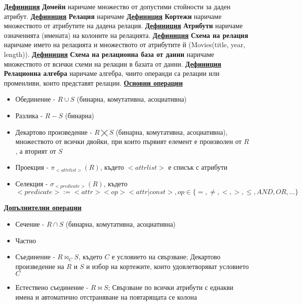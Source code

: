 \documentclass{article}
\begin{document}
\textbf{\underline{Дефиниция}}
\textbf{Домейн} наричаме множество от допустими стойности за даден атрибут. \newline\newline
\textbf{\underline{Дефиниция}}
\textbf{Релация} наричаме \newline\newline
\textbf{\underline{Дефиниция}}
\textbf{Кортежи} наричаме множеството от атрибутите на дадена релация. \newline\newline
\textbf{\underline{Дефиниция}}
\textbf{Атрибути} наричаме означенията (имената) на колоните на релацията. \newline\newline
\textbf{\underline{Дефиниция}}
\textbf{Схема на релация} наричаме името на релацията и множеството от атрибутите й (Movies(title, year, length)). \newline\newline
\textbf{\underline{Дефиниция}}
\textbf{Схема на релационна база от данни} наричаме множеството от всички схеми на релации в базата от данни. \newline\newline
\textbf{\underline{Дефиниция}}
\textbf{Релационна алгебра} наричаме алгебра, чиито операнди са релации или променливи, които представят релации. \newline\newline
\textbf{\underline{Основни операции}}
\begin{itemize}
    \item Обединение - $R \cup S$ (бинарна, комутативна, асоциативна)
    \item Разлика - $R - S$ (бинарна)
    \item Декартово произведение - $R \bigtimes S$ (бинарна, комутативна, асоциативна), множеството от всички двойки, при
    които първият елемент е произволен от $R$, а вторият от $S$
    \item Проекция - $\pi_{<attr list>}(R)$, където $<attrlist>$ е списък с атрибути
    \item Селекция - $\sigma_{<predicate>}(R)$, където $<predicate> := <attr><op><attr|const>, op \in \{=, \neq, <, >, \le, AND, OR, ...\}$
\end{itemize}
\textbf{\underline{Допълнителни операции}}
\begin{itemize}
    \item Сечение - $R \cap S$ (бинарна, комутативна, асоциативна)
    \item Частно
    \item Съединение - $R \bowtie_C S$, където $C$ е условието на свързване; Декартово произведение на $R$ и $S$
    и избор на кортежите, които удовлетворяват условието $C$
    \item Естествено съединение - $R \bowtie S$; Свързване по всички атрибути с еднакви имена и автоматично
    отстраняване на повтарящата се колона
\end{itemize}
\end{document}
